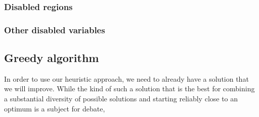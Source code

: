 \documentclass[letterpaper, 11pt]{article}
\begin{document}
\begin{multicols}{2}
\subsubsection{Disabled regions}

\subsubsection{Other disabled variables}


\subsection{Greedy algorithm}
In order to use our heuristic approach, we need to already have a solution
that we will improve. While the kind of such a solution that is the best for
combining a substantial diversity of possible solutions and starting reliably
close to an optimum is a subject for debate,

\end{multicols}
\end{document}
